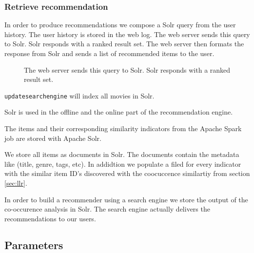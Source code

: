 \subsubsection{Retrieve recommendation}

In order to produce recommendations we compose a Solr query from the user history. The user history is stored in the web log. The web server sends this query to Solr. Solr responds with a ranked result set. The web server then formats the response from Solr and sends a list of recommended items to the user.

\begin{figure}
\centering
{}
\caption{The web server sends this query to Solr. Solr responds with a ranked result set.}
\end{figure}

\verb|updatesearchengine| will index all movies in Solr.

Solr is used in the offline and the online part of the recommendation engine.

The items and their corresponding similarity indicators from the Apache Spark job are stored with Apache Solr. 

We store all items as documents in Solr. The documents contain the metadata like (title, genre, tags, etc). In addidtion we populate a filed for every indicator with the similar item ID's discovered with the coocuccence similartiy from section \ref{sec:llr}.

In order to build a recommender using a search engine we store the output of the co-occurence analysis in Solr. The search engine actually delivers the recommendations to our users.

\subsection{Parameters}
\label{sec:parameters}

